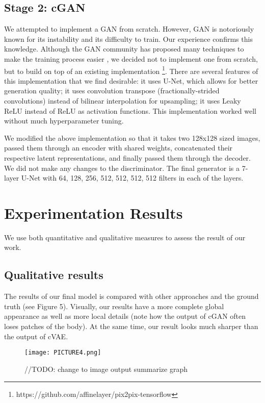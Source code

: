 \documentclass[10pt,conference]{IEEEtran}
\begin{document}
\subsection{Stage 2: cGAN}

We attempted to implement a GAN from scratch. However, GAN is notoriously known for its instability and its difficulty to train. Our experience confirms this knowledge. Although the GAN community has proposed many techniques to make the training process easier \autocite{salimans2016improved, arjovsky2017wasserstein, karras2017progressive}, we decided not to implement one from scratch, but to build on top of an existing implementation \footnote{https://github.com/affinelayer/pix2pix-tensorflow}. There are several features of this implementation that we find desirable: it uses U-Net, which allows for better generation quality; it uses convolution transpose (fractionally-strided convolutions) instead of bilinear interpolation for upsampling; it uses Leaky ReLU instead of ReLU as activation functions. This implementation worked well without much hyperparameter tuning.

We modified the above implementation so that it takes two 128x128 sized images, passed them through an encoder with shared weights, concatenated their respective latent representations, and finally passed them through the decoder. We did not make any changes to the discriminator. The final generator is a 7-layer U-Net with 64, 128, 256, 512, 512, 512, 512 filters in each of the layers.

\section{Experimentation Results}

We use both quantitative and qualitative measures to assess the result of our work.

\subsection{Qualitative results}

The results of our final model is compared with other approaches and the ground truth (see Figure 5). Visually, our results have a more complete global appearance as well as more local details (note how the output of cGAN often loses patches of the body). At the same time, our result looks much sharper than the output of cVAE.

\begin{figure}[htbp]
\centering
\texttt{[image: PICTURE4.png]}
\caption{//TODO: change to image output summarize graph}
\end{figure}
\end{document}
